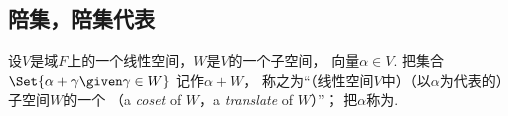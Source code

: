 \subsection{陪集，陪集代表}
\begin{definition}
设\(V\)是域\(F\)上的一个线性空间，\(W\)是\(V\)的一个子空间，
向量\(\alpha \in V\).
把集合\(\Set{ \alpha + \gamma \given \gamma \in W }\)
记作\(\alpha+W\)，
称之为“（线性空间\(V\)中）（以\(\alpha\)为代表的）子空间\(W\)的一个%
（a \emph{coset} of \(W\)，a \emph{translate} of \(W\)）”；
把\(\alpha\)称为.
\end{definition}

